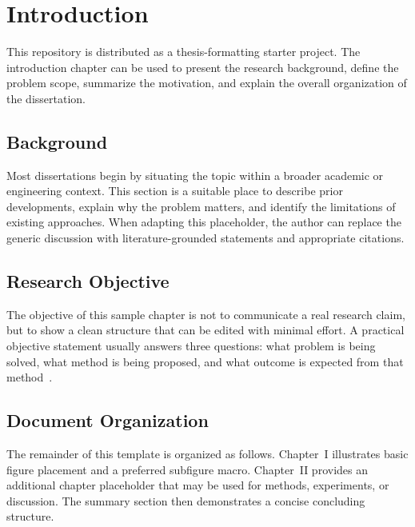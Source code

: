 \chapter{Introduction}

This repository is distributed as a thesis-formatting starter project. The introduction chapter can be used to present the research background, define the problem scope, summarize the motivation, and explain the overall organization of the dissertation.

\section{Background}

Most dissertations begin by situating the topic within a broader academic or engineering context. This section is a suitable place to describe prior developments, explain why the problem matters, and identify the limitations of existing approaches. When adapting this placeholder, the author can replace the generic discussion with literature-grounded statements and appropriate citations.

\section{Research Objective}

The objective of this sample chapter is not to communicate a real research claim, but to show a clean structure that can be edited with minimal effort. A practical objective statement usually answers three questions: what problem is being solved, what method is being proposed, and what outcome is expected from that method~\cite{abbott2015}.

\section{Document Organization}

The remainder of this template is organized as follows. Chapter~I illustrates basic figure placement and a preferred subfigure macro. Chapter~II provides an additional chapter placeholder that may be used for methods, experiments, or discussion. The summary section then demonstrates a concise concluding structure.
